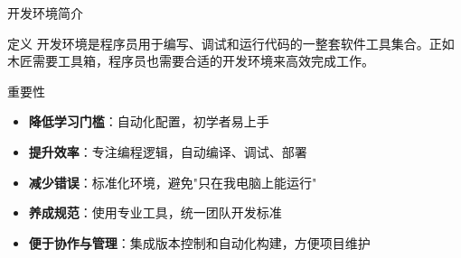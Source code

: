 \documentclass[UTF8,aspectratio=169]{beamer}
\begin{document}
\begin{frame}{开发环境简介}
    \begin{ytublock}{定义}
        开发环境是程序员用于编写、调试和运行代码的一整套软件工具集合。正如木匠需要工具箱，程序员也需要合适的开发环境来高效完成工作。
    \end{ytublock}

    \begin{ytublock}{重要性}
        \begin{itemize}
            \item \textbf{降低学习门槛}：自动化配置，初学者易上手
            \item \textbf{提升效率}：专注编程逻辑，自动编译、调试、部署
            \item \textbf{减少错误}：标准化环境，避免"只在我电脑上能运行"
            \item \textbf{养成规范}：使用专业工具，统一团队开发标准
            \item \textbf{便于协作与管理}：集成版本控制和自动化构建，方便项目维护
        \end{itemize}
    \end{ytublock}
\end{frame}
\end{document}
